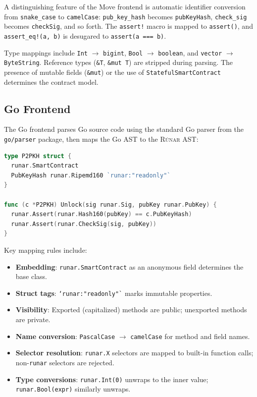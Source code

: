 \documentclass[11pt,a4paper]{article}
\newcommand{\runar}{\textsc{Rúnar}}
\newcommand{\bs}{\texttt{ByteString}}
\newcommand{\bigintty}{\texttt{bigint}}
\newcommand{\boolty}{\texttt{boolean}}
\begin{document}
A distinguishing feature of the Move frontend is automatic identifier
conversion from \texttt{snake\_case} to \texttt{camelCase}:
\texttt{pub\_key\_hash} becomes \texttt{pubKeyHash},
\texttt{check\_sig} becomes \texttt{checkSig}, and so forth. The
\texttt{assert!} macro is mapped to \texttt{assert()}, and
\texttt{assert\_eq!(a, b)} is desugared to \texttt{assert(a === b)}.

Type mappings include \texttt{Int} $\to$ \bigintty{},
\texttt{Bool} $\to$ \boolty{}, and \texttt{vector} $\to$ \bs{}.
Reference types (\texttt{\&T}, \texttt{\&mut T}) are stripped during parsing.
The presence of mutable fields (\texttt{\&mut}) or the use of
\texttt{StatefulSmartContract} determines the contract model.

\subsection{Go Frontend}
\label{sec:frontend-go}

The Go frontend parses Go source code using the standard Go parser from
the \texttt{go/parser} package, then maps the Go AST to the \runar{} AST:

\begin{lstlisting}[style=runar,language=Go,
  morekeywords={type,struct,func}]
type P2PKH struct {
  runar.SmartContract
  PubKeyHash runar.Ripemd160 `runar:"readonly"`
}

func (c *P2PKH) Unlock(sig runar.Sig, pubKey runar.PubKey) {
  runar.Assert(runar.Hash160(pubKey) == c.PubKeyHash)
  runar.Assert(runar.CheckSig(sig, pubKey))
}
\end{lstlisting}

Key mapping rules include:

\begin{itemize}[nosep]
  \item \textbf{Embedding}: \texttt{runar.SmartContract} as an anonymous
    field determines the base class.
  \item \textbf{Struct tags}: \texttt{`runar:"readonly"`} marks immutable
    properties.
  \item \textbf{Visibility}: Exported (capitalized) methods are public;
    unexported methods are private.
  \item \textbf{Name conversion}: \texttt{PascalCase} $\to$
    \texttt{camelCase} for method and field names.
  \item \textbf{Selector resolution}: \texttt{runar.X} selectors are mapped
    to built-in function calls; non-\texttt{runar} selectors are rejected.
  \item \textbf{Type conversions}: \texttt{runar.Int(0)} unwraps to the
    inner value; \texttt{runar.Bool(expr)} similarly unwraps.
\end{itemize}
\end{document}
